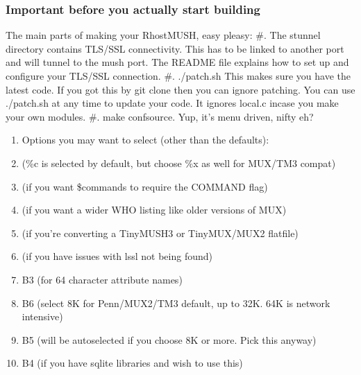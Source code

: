 \documentclass[letterpaper,10pt,english]{sphinxmanual}
\begin{document}
\subsubsection{Important before you actually start building}
\label{\detokenize{installation:important-before-you-actually-start-building}}
\sphinxAtStartPar
The main parts of making your RhostMUSH, easy pleasy:
\#.  The stunnel directory contains TLS/SSL connectivity.  This has to be linked to another port and will tunnel to the mush port.  The README file explains how to set up and configure your TLS/SSL connection.
\#.  ./patch.sh \textendash{} This makes sure you have the latest code.  If you got this by git clone  then you can ignore patching.  You can use ./patch.sh at any time to update your code.  It ignores local.c incase you make your own modules.
\#.  make confsource.  Yup, it’s menu driven, nifty eh?
\begin{enumerate}
%
\item {} 
\sphinxAtStartPar
Options you may want to select (other than the defaults):

\item {} 
  (\%c is selected by default, but choose \%x as well for MUX/TM3 compat)

\item {} 
  (if you want \$commands to require the COMMAND flag)

\item {} 
 (if you want a wider WHO listing like older versions of MUX)

\item {} 
 (if you’re converting a TinyMUSH3 or TinyMUX/MUX2 flatfile)

\item {} 
 (if you have issues with \sphinxhyphen{}lssl not being found)

\item {} 
\sphinxAtStartPar
B3 (for 64 character attribute names)

\item {} 
\sphinxAtStartPar
B6 (select 8K for Penn/MUX2/TM3 default, up to 32K.  64K is network intensive)

\item {} 
\sphinxAtStartPar
B5 (will be autoselected if you choose 8K or more.  Pick this anyway)

\item {} 
\sphinxAtStartPar
B4 (if you have sqlite libraries and wish to use this)

\end{enumerate}
\end{document}
